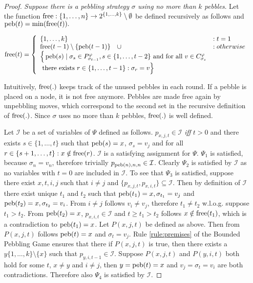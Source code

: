 \begin{proof}
\emph{Suppose there is a pebbling strategy $\sigma$ using no more than $k$ pebbles}. Let the function $\operatorname{free}: \{1,\ldots,n\} \rightarrow 2^{\{1,\ldots,k\}} \setminus \emptyset$ be defined recursively as follows and $\operatorname{peb}(t) = \min(\operatorname{free}(t)).$

$$
\operatorname{free}(t) = \left\{
  \begin{array}{ll}
    \{1,\ldots,k\} & : t = 1\\
    \operatorname{free}(t-1) \setminus \{\operatorname{peb}(t-1)\} \quad \cup & : otherwise\\
		\Big\{\operatorname{peb}(s) \mid \sigma_{s} \in P_{\sigma_{t-1}}^{\varphi}, s \in \{1,\ldots,t-2\} \text{ and for all } v \in C_{\sigma_{s}}^{\varphi}&\\
		\text{ there exists } r \in \{1,\ldots,t-1\}: \sigma_{r} = v \Big\}&
  \end{array}
\right.
$$

Intuitively, $\operatorname{free}(.)$ keeps track of the unused pebbles in each round.
If a pebble is placed on a node, it is not free anymore.
Pebbles are made free again by unpebbling moves, which correspond to the second set in the recursive definition of $\operatorname{free}(.)$.
Since $\sigma$ uses no more than $k$ pebbles, $\operatorname{free}(.)$ is well defined.

Let $\mathcal{I}$ be a set of variables of $\Psi$ defined as follows.
$p_{x,j,t} \in \mathcal{I}$ \emph{iff} $t > 0$ and there exists $s \in \{1,\ldots,t\}$ such that $\operatorname{peb}(s) = x$, $\sigma_s = v_j$ and for all $r \in \{s+1,\ldots,t\}: x \notin \operatorname{free}(r)$.
$\mathcal{I}$ is a satisfying assignment for $\Psi$.
$\Psi_1$ is satisfied, because $\sigma_n = v_n$, therefore trivially $p_{\operatorname{peb}(n),n,n} \in \mathcal{I}$.
Clearly $\Psi_2$ is satisfied by $\mathcal{I}$ as no variables with $t = 0$ are included in $\mathcal{I}$.
To see that $\Psi_3$ is satisfied, suppose there exist $x,t,i,j$ such that $i \neq j$ and $\{p_{x,j,t},p_{x,i,t}\} \subseteq \mathcal{I}$.
Then by definition of $\mathcal{I}$ there exist unique $t_1$ and $t_2$ such that $\operatorname{peb}(t_1) = x, \sigma_{t_1} = v_j$ and $\operatorname{peb}(t_2) = x, \sigma_{t_2} = v_i$.
From $i \neq j$ follows $v_i \neq v_j$, therefore $t_1 \neq t_2$ w.l.o.g. suppose $t_1 > t_2$.
From $\operatorname{peb}(t_2) = x$, $p_{x,i,t} \in \mathcal{I}$ and $t \geq t_1 > t_2$ follows $x \notin \operatorname{free}(t_1)$, which is a contradiction to $\operatorname{peb}(t_1) = x$.
Let $P(x,j,t)$ be defined as above. Then from $P(x,j,t)$ follows $\operatorname{peb}(t) = x$ and $\sigma_t = v_j$.
Rule \ref{rule:premises} of the Bounded Pebbling Game ensures that there if $P(x,j,t)$ is true, then there exists a $y \{1,\ldots,k\} \setminus \{x\}$ such that $p_{y,i,t-1} \in \mathcal{I}$.
Suppose $P(x,j,t)$ and $P(y,i,t)$ both hold for some $t$, $x \neq y$ and $i \neq j$, then $y = \operatorname{peb}(t) = x$ and $v_j = \sigma_t = v_i$ are both contradictions. 
Therefore also $\Psi_4$ is satisfied by $\mathcal{I}$.

\end{proof}